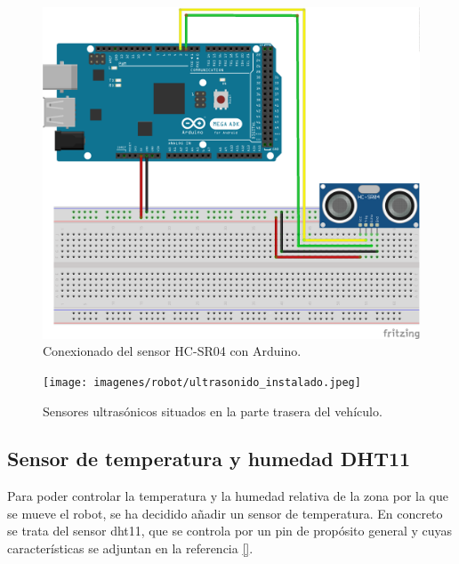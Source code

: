 \begin{figure}[H]
  \begin{center}
    \includegraphics[scale=0.6]{imagenes/conexionado_ultrasonido.png}
  \end{center}
  \caption{Conexionado del sensor HC-SR04 con Arduino.}
  \label{figura:sensor_HC-SR04_conexionado}
\end{figure}


 \begin{figure}[H]
  \begin{center}
    \texttt{[image: imagenes/robot/ultrasonido\_instalado.jpeg]}
  \end{center}
  \caption{Sensores ultrasónicos situados en la parte trasera del vehículo.}
  \label{figura:sensor_mq_2_potenciometro}
\end{figure}

\subsection{Sensor de temperatura y humedad DHT11}
\label{sec:dth11}


Para poder controlar la temperatura y la humedad relativa de la zona por la que se mueve el
robot, se ha decidido añadir un sensor de temperatura. En concreto se trata del sensor dht11, que
se controla por un pin de propósito general y cuyas características se adjuntan en la referencia \ref{}.

